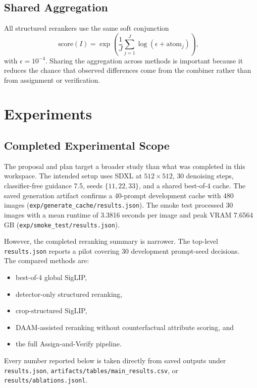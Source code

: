 \documentclass{article}
\newcommand{\method}{Assign-and-Verify\xspace}
\newcommand{\daam}{DAAM\xspace}
\newcommand{\sdxl}{SDXL\xspace}
\begin{document}
\subsection{Shared Aggregation}

All structured rerankers use the same soft conjunction
\begin{equation}
\mathrm{score}(I)=
\exp\left(
\frac{1}{J}\sum_{j=1}^{J}\log(\epsilon+\mathrm{atom}_j)
\right),
\end{equation}
with $\epsilon=10^{-4}$. Sharing the aggregation across methods is important because it reduces the chance that observed differences come from the combiner rather than from assignment or verification.

\section{Experiments}
\label{sec:experiments}

\subsection{Completed Experimental Scope}

The proposal and plan target a broader study than what was completed in this workspace. The intended setup uses \sdxl at $512\times512$, 30 denoising steps, classifier-free guidance 7.5, seeds $\{11,22,33\}$, and a shared best-of-4 cache. The saved generation artifact confirms a 40-prompt development cache with 480 images (\texttt{exp/generate\_cache/results.json}). The smoke test processed 30 images with a mean runtime of 3.3816 seconds per image and peak VRAM 7.6564 GB (\texttt{exp/smoke\_test/results.json}).

However, the completed reranking summary is narrower. The top-level \texttt{results.json} reports a pilot covering 30 development prompt-seed decisions. The compared methods are:
\begin{itemize}[leftmargin=*,topsep=2pt,itemsep=2pt]
  \item best-of-4 global SigLIP,
  \item detector-only structured reranking,
  \item crop-structured SigLIP,
  \item \daam-assisted reranking without counterfactual attribute scoring, and
  \item the full \method pipeline.
\end{itemize}

Every number reported below is taken directly from saved outputs under \texttt{results.json}, \texttt{artifacts/tables/main\_results.csv}, or \texttt{results/ablations.jsonl}.
\end{document}
